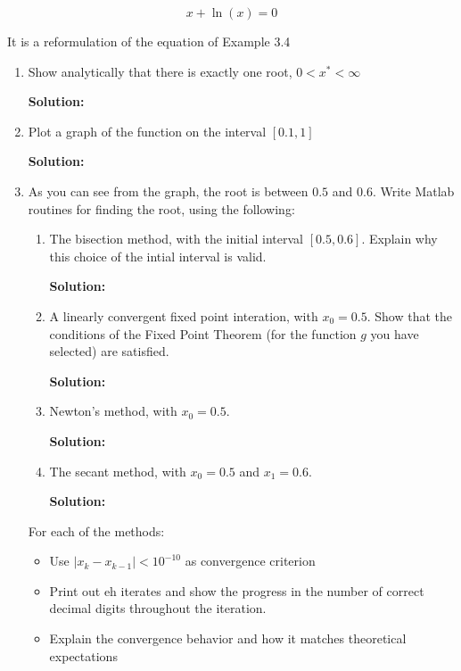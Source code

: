 \documentclass[12pt]{article}
\newcommand{\abs}[1]{\left| #1 \right|}
\begin{document}
\begin{enumerate}
\[
x + \ln(x) = 0
\]

It is a reformulation of the equation of Example 3.4

\begin{enumerate}
  \item Show analytically that there is exactly one root, $0 < x^{*} < \infty$

  {\bf Solution:}

  \item Plot a graph of the function on the interval $[0.1, 1]$

  {\bf Solution:}

  \item As you can see from the graph, the root is between $0.5$ and $0.6$. Write
  {\sc Matlab} routines for finding the root, using the following:
  \begin{enumerate}
    \item The bisection method, with the initial interval $[0.5,0.6]$. Explain
    why this choice of the intial interval is valid.

    {\bf Solution:}

    \item A linearly convergent fixed point interation, with $x_{0} = 0.5$. Show that
    the conditions of the Fixed Point Theorem (for the function $g$ you have selected)
    are satisfied.

    {\bf Solution:}

    \item Newton's method, with $x_{0} = 0.5$.

    {\bf Solution:}

    \item The secant method, with $x_{0} = 0.5$ and $x_{1} = 0.6$.

    {\bf Solution:}


  \end{enumerate}
  For each of the methods:
  \begin{itemize}
    \item Use $\abs{ x_{k} - x_{k-1}} < 10^{-10}$ as convergence criterion
    \item Print out eh iterates and show the progress in the number of correct decimal
    digits throughout the iteration.
    \item Explain the convergence behavior and how it matches theoretical expectations
  \end{itemize}
\end{enumerate}
\end{enumerate}
\end{document}
